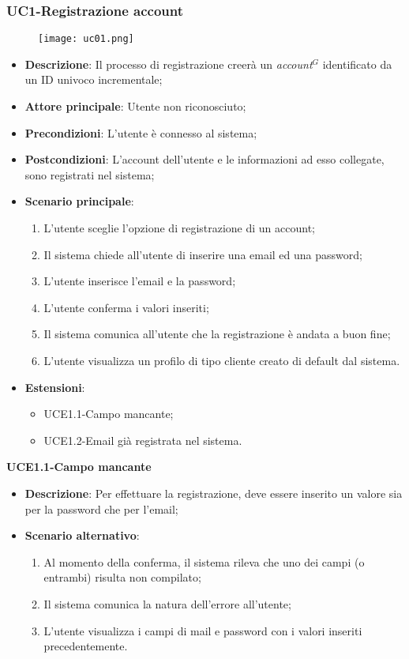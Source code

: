 \nonstopmode
\subsubsection{UC1-Registrazione account}
\begin{figure}[h] \texttt{[image: uc01.png]} \end{figure}

\begin{itemize}
\item \textbf{Descrizione}: Il processo di registrazione creerà un \emph{account}$^{G}$ identificato da un ID univoco incrementale;
\item \textbf{Attore principale}: Utente non riconosciuto;
\item \textbf{Precondizioni}: L'utente è connesso al sistema;
\item \textbf{Postcondizioni}: L'account dell'utente e le informazioni ad esso collegate, sono registrati nel sistema;
\item \textbf{Scenario principale}:
\begin{enumerate}
\item L'utente sceglie l'opzione di registrazione di un account;
\item Il sistema chiede all'utente di inserire una email ed una password;
\item L'utente inserisce l'email e la password;
\item L'utente conferma i valori inseriti;
\item Il sistema comunica all'utente che la registrazione è andata a buon fine;
\item L'utente visualizza un profilo di tipo cliente creato di default dal sistema.
\end{enumerate}
\item \textbf{Estensioni}:
\begin{itemize}
\item UCE1.1-Campo mancante;
\item UCE1.2-Email già registrata nel sistema.
\end{itemize}
\end{itemize}

\textbf{UCE1.1-Campo mancante}

\begin{itemize}
\item \textbf{Descrizione}: Per effettuare la registrazione, deve essere inserito un valore sia per la password che per l'email;
\item \textbf{Scenario alternativo}:
\begin{enumerate}
\item Al momento della conferma, il sistema rileva che uno dei campi (o entrambi) risulta non compilato;
\item Il sistema comunica la natura dell'errore all'utente;
\item L'utente visualizza i campi di mail e password con i valori inseriti precedentemente.
\end{enumerate}
\end{itemize}

